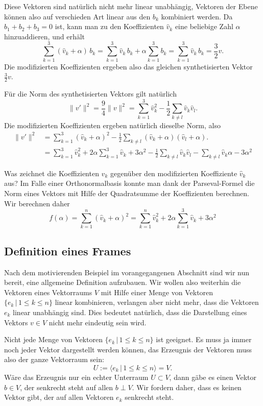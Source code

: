 Diese Vektoren sind natürlich nicht mehr linear unabhängig, Vektoren
der Ebene können also auf verschieden Art linear aus den $b_k$ kombiniert
werden.
Da $b_1+b_2+b_3=0$ ist, kann man zu den Koeffizienten $\hat{v}_k$
eine beliebige Zahl $\alpha$ hinzuaddieren, und erhält
\[
\sum_{k=1}^3 (\hat{v}_k+\alpha)\, b_k
=
\sum_{k=1}^3 \hat{v}_k\,b_k
+\alpha
\sum_{k=1}^3 b_k
=
\sum_{k=1}^3 \hat{v}_k\,b_k
=
\frac32 v.
\]
Die modifizierten Koeffizienten ergeben also das gleichen synthetisierten
Vektor $\frac32 v$.

Für die Norm des synthetisierten Vektors gilt natürlich
\[
\|v'\|^2
=
\frac94\|v\|^2
=
\sum_{k=1}^3 \hat{v}_k^2 
-
\frac12\sum_{k\ne l} \hat{v}_k\hat{v}_l.
\]
Die modifizierten Koeffizienten ergeben natürlich dieselbe Norm, also
\begin{align*}
\|v'\|^2
&=
\sum_{k=1}^3 (\hat{v}_k+\alpha)^2 
-
\frac12\sum_{k\ne l} (\hat{v}_k+\alpha)(\hat{v}_l+\alpha).
\\
&=
\sum_{k=1}^3 \hat{v}_k^2
+2\alpha \sum_{k=1}^3 \hat{v}_k
+3\alpha^2
-
\frac12\sum_{k\ne l} \hat{v}_k\hat{v}_l
-
\sum_{k\ne l} \hat{v}_k \alpha
-
3\alpha^2
\end{align*}


Was zeichnet die Koeffizienten $\hat{v}_k$ gegenüber den modifizierten
Koeffiziente $\hat{v}_k$ aus?
Im Falle einer Orthonormalbasis konnte man dank der Parseval-Formel
die Norm eines Vektors mit Hilfe der Quadratsumme der Koeffizienten
berechnen.
Wir berechnen daher
\[
f(\alpha)
=
\sum_{k=1}^n (\hat{v}_k+\alpha)^2
=
\sum_{k=1}^n \hat{v}_k^2 + 2\alpha \sum_{k=1}^3 \hat{v}_k + 3\alpha^2
\]

\subsection{Definition eines Frames}
Nach dem motivierenden Beispiel im vorangegangenen Abschnitt sind wir nun
bereit, eine allgemeine Definition aufzubauen.
Wir wollen also weiterhin die Vektoren eines Vektorraums $V$ mit Hilfe
einer Menge von Vektoren $\{e_k\,|\,1\le k\le n\}$ linear kombinieren,
verlangen aber nicht mehr, dass die Vektoren $e_k$ linear unabhängig sind.
Dies bedeutet natürlich, dass die Darstellung eines Vektors $v\in V$
nicht mehr eindeutig sein wird.

Nicht jede Menge von Vektoren $\{e_k\,|\,1\le k\le n\}$ ist geeignet.
Es muss ja immer noch jeder Vektor dargestellt werden können, das
Erzeugnis der Vektoren muss also der ganze Vektorraum sein:
\[
U
:=
\langle e_k\,|\,1\le k\le n\rangle
=
V.
\]
Wäre das Erzeugnis nur ein echter Unterraum $U\subset V$, dann gäbe es
einen Vektor $b\in V$, der senkrecht steht auf allen $b\perp V$.
Wir fordern daher, dass es keinen Vektor gibt, der auf allen Vektoren $e_k$
senkrecht steht.


